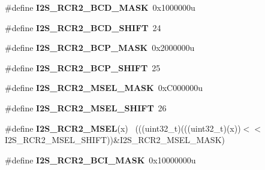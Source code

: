 \begin{DoxyCompactItemize}
\item 
\hypertarget{group___i2_s___register___masks_gada87418ab4529692585474e6586d0dc2}{}\#define {\bfseries I2\+S\+\_\+\+R\+C\+R2\+\_\+\+B\+C\+D\+\_\+\+M\+A\+S\+K}~0x1000000u\label{group___i2_s___register___masks_gada87418ab4529692585474e6586d0dc2}

\item 
\hypertarget{group___i2_s___register___masks_ga13a6f638b14d217719d05d50e7d010ed}{}\#define {\bfseries I2\+S\+\_\+\+R\+C\+R2\+\_\+\+B\+C\+D\+\_\+\+S\+H\+I\+F\+T}~24\label{group___i2_s___register___masks_ga13a6f638b14d217719d05d50e7d010ed}

\item 
\hypertarget{group___i2_s___register___masks_ga2131afd85c44b3770c4f13aa313255d7}{}\#define {\bfseries I2\+S\+\_\+\+R\+C\+R2\+\_\+\+B\+C\+P\+\_\+\+M\+A\+S\+K}~0x2000000u\label{group___i2_s___register___masks_ga2131afd85c44b3770c4f13aa313255d7}

\item 
\hypertarget{group___i2_s___register___masks_ga5ab6e46c9fe897adc5d9205c5eed1af4}{}\#define {\bfseries I2\+S\+\_\+\+R\+C\+R2\+\_\+\+B\+C\+P\+\_\+\+S\+H\+I\+F\+T}~25\label{group___i2_s___register___masks_ga5ab6e46c9fe897adc5d9205c5eed1af4}

\item 
\hypertarget{group___i2_s___register___masks_gaedf6545e7c28305ad5d4b65a439db838}{}\#define {\bfseries I2\+S\+\_\+\+R\+C\+R2\+\_\+\+M\+S\+E\+L\+\_\+\+M\+A\+S\+K}~0x\+C000000u\label{group___i2_s___register___masks_gaedf6545e7c28305ad5d4b65a439db838}

\item 
\hypertarget{group___i2_s___register___masks_gad12cb75f50dddf2a5364e04a0ec59b83}{}\#define {\bfseries I2\+S\+\_\+\+R\+C\+R2\+\_\+\+M\+S\+E\+L\+\_\+\+S\+H\+I\+F\+T}~26\label{group___i2_s___register___masks_gad12cb75f50dddf2a5364e04a0ec59b83}

\item 
\hypertarget{group___i2_s___register___masks_ga4a5d45f59b119929a38d0d3e761fb7d1}{}\#define {\bfseries I2\+S\+\_\+\+R\+C\+R2\+\_\+\+M\+S\+E\+L}(x)                                              ~(((uint32\+\_\+t)(((uint32\+\_\+t)(x))$<$$<$I2\+S\+\_\+\+R\+C\+R2\+\_\+\+M\+S\+E\+L\+\_\+\+S\+H\+I\+F\+T))\&I2\+S\+\_\+\+R\+C\+R2\+\_\+\+M\+S\+E\+L\+\_\+\+M\+A\+S\+K)\label{group___i2_s___register___masks_ga4a5d45f59b119929a38d0d3e761fb7d1}

\item 
\hypertarget{group___i2_s___register___masks_ga38210c72a39c29ee6ce38ff654c471cb}{}\#define {\bfseries I2\+S\+\_\+\+R\+C\+R2\+\_\+\+B\+C\+I\+\_\+\+M\+A\+S\+K}~0x10000000u\label{group___i2_s___register___masks_ga38210c72a39c29ee6ce38ff654c471cb}


\end{DoxyCompactItemize}
